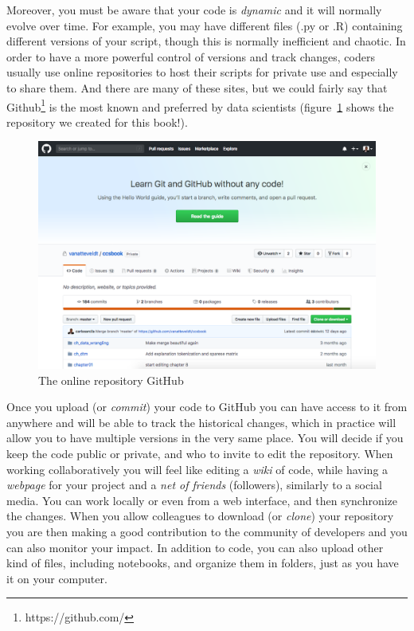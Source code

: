 Moreover, you must be aware that your code is \textit{dynamic} and it will normally evolve over time. For example, you may have different files (.py or .R) containing different versions of your script, though this is normally inefficient and chaotic. In order to have a more powerful control of versions and track changes, coders usually use online repositories to host their scripts for private use and especially to share them. And there are many of these sites, but we could fairly say that Github\footnote{https://github.com/} is the most known and preferred by data scientists (figure~\ref{fig:github} shows the repository we created for this book!).

\begin{figure}
\centering
\includegraphics[width=0.9\linewidth]{figures/ch04_github}
\caption{The online repository GitHub}
\label{fig:github}
\end{figure}
 
Once you upload (or \textit{commit}) your code to GitHub you can have access to it from anywhere and will be able to track the historical changes, which in practice will allow you to have multiple versions in the very same place. You will decide if you keep the code public or private, and who to invite to edit the repository. When working collaboratively you will feel like editing a \textit{wiki} of code, while having a \textit{webpage} for your project and a \textit{net of friends} (followers), similarly to a social media. You can work locally or even from a web interface, and then synchronize the changes. When you allow colleagues to download (or \textit{clone}) your repository you are then making a good contribution to the community of developers and you can also monitor your impact. In addition to code, you can also upload other kind of files, including notebooks, and organize them in folders, just as you have it on your computer.


